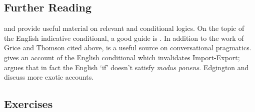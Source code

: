 {\small
\subsection*{Further Reading}


\citet{bevpospa} and \citet{burphilo} provide useful material on relevant and conditional logics. On the topic of the English indicative conditional, a good guide is \citet{edgington}. In addition to the work of Grice and Thomson cited above, \citet{sep-implicature} is a useful source on conversational pragmatics. \citet{stalnaker} gives an account of the English conditional which invalidates Import-Export; \citet{mcgee} argues that in fact the English `if' doesn't satisfy \emph{modus ponens}. Edgington and \citet{kratzer} discuss more exotic accounts.

 



\subsection*{Exercises}\label{ex:cond}


}
